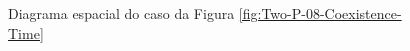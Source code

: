 \documentclass{article}
\begin{document}
	\begin{figure}[h]
		\centering
		\qquad
		\caption{Diagrama espacial do caso da Figura \ref{fig:Two-P-08-Coexistence-Time}}
		\label{fig:Two-P-10-Coexistence-Space}
	\end{figure}	
	
\end{document}
